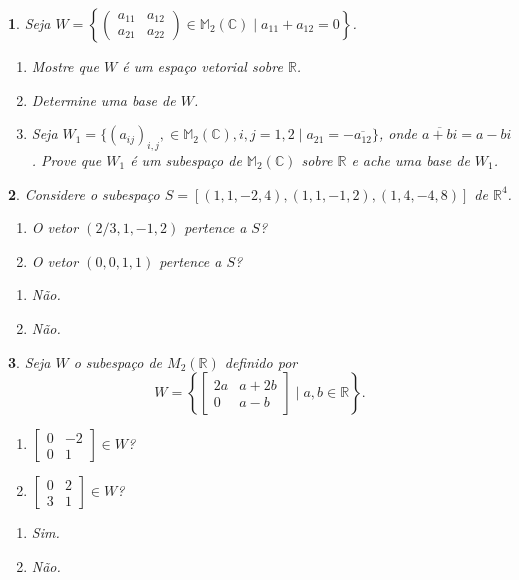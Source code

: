 \documentclass[12pt]{exam}
\newtheorem{exercicio}{}
\newcommand{\real}{\mathbb{R}}
\newcommand{\complex}{\mathbb{C}}
\newcommand{\cp}[1]{\mathbb{#1}}
\begin{document}
\begin{exercicio}
  Seja $W = \left\{\begin{pmatrix} a_{11} & a_{12}\\ a_{21} & a_{22}\end{pmatrix} \in \cp{M}_2(\complex) \mid a_{11} + a_{12} = 0\right\}$.
  \begin{enumerate}[label={\alph*})]
    \item Mostre que $W$ \'e um espa\c{c}o vetorial sobre $\real$.
    \item Determine uma base de $W$.
    \item Seja $W_1 = \{(a_{ij})_{i,j}, \in \cp{M}_2(\complex), i, j = 1, 2 \mid a_{21} = -\overline{a_{12}}\}$, onde $\overline{a + bi} = a - bi$. Prove que $W_1$ \'e um subespa\c{c}o de $\cp{M}_2(\complex)$ sobre $\real$ e ache uma base de $W_1$.
  \end{enumerate}
\end{exercicio}

\begin{exercicio}
  Considere o subespa\c{c}o $S = [(1,1,-2,4),(1,1,-1,2),(1,4,-4,8)]$ de $\real^4$.
  \begin{enumerate}[label={\alph*})]
    \item O vetor $(2/3, 1, -1, 2)$ pertence a $S$?
    \item O vetor $(0, 0, 1, 1)$ pertence a $S$?
  \end{enumerate}
  \begin{solucao}
    \begin{enumerate}[label={\alph*})]
      \item N\~ao.
      \item N\~ao.
    \end{enumerate}
  \end{solucao}
\end{exercicio}

\begin{exercicio}
  Seja $W$ o subespa\c{c}o de $M_2(\real)$ definido por
  \[
    W = \left\{\begin{bmatrix}2a & a + 2b\\0 & a - b\end{bmatrix} \mid a, b \in \real\right\}.
  \]
  \begin{enumerate}[label={\alph*})]
      \item $\begin{bmatrix}0 & -2\\0 & 1\end{bmatrix} \in W$?
      \item $\begin{bmatrix}0 & 2\\3 & 1\end{bmatrix} \in W$?
    \end{enumerate}
  \begin{solucao}
  \begin{enumerate}[label={\alph*})]
      \item Sim.
      \item N\~ao.
    \end{enumerate}
  \end{solucao}
\end{exercicio}
\end{document}
